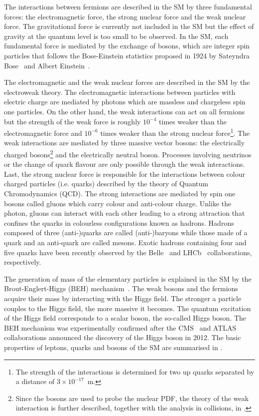 The interactions between fermions are described in the SM by three fundamental forces: the electromagnetic force, the strong nuclear force and the weak nuclear force. The gravitational force is currently not included in the SM but the effect of gravity at the quantum level is too small to be observed. In the SM, each fundamental force is mediated by the exchange of bosons, which are integer spin particles that follows the Bose-Einstein statistics proposed in 1924 by Sateyndra Bose~\cite{BoseEinsteinStatistics_1} and Albert Einstein~\cite{BoseEinsteinStatistics_2}.

The electromagnetic and the weak nuclear forces are described in the SM by the electroweak theory. The electromagnetic interactions between particles with electric charge are mediated by photons which are massless and chargeless spin one particles. On the other hand, the weak interactions can act on all fermions but the strength of the weak force is roughly $10^{-4}$ times weaker than the electromagnetic force and $10^{-6}$ times weaker than the strong nuclear force\footnote{The strength of the interactions is determined for two up quarks separated by a distance of $3\times{10^{-17}}$~m.}. The weak interactions are mediated by three massive vector bosons: the electrically charged \Wpm bosons\footnote{Since the \Wb bosons are used to probe the nuclear PDF, the theory of the weak interaction is further described, together with the analysis in \RunpPb collisions, in .} and the electrically neutral {\PZ} boson. Processes involving neutrinos or the change of quark flavour are only possible through the weak interactions. Last, the strong nuclear force is responsible for the interactions between colour charged particles (i.e. quarks) described by the theory of Quantum Chromodynamics (QCD). The strong interactions are mediated by spin one bosons called gluons which carry colour and anti-colour charge. Unlike the photon, gluons can interact with each other leading to a strong attraction that confines the quarks in colourless configurations known as hadrons. Hadrons composed of three (anti-)quarks are called (anti-)baryons while those made of a quark and an anti-quark are called mesons. Exotic hadrons containing four and five quarks have been recently observed by the Belle~\cite{Tetraquark} and LHCb~\cite{Pentaquarks} collaborations, respectively.

The generation of mass of the elementary particles is explained in the SM by the Brout-Englert-Higgs (BEH) mechanism~\cite{HiggsMechanism_1,HiggsMechanism_2}. The weak bosons and the fermions acquire their mass by interacting with the Higgs field. The stronger a particle couples to the Higgs field, the more massive it becomes. The quantum excitation of the Higgs field corresponds to a scalar boson, the so-called Higgs boson. The BEH mechanism was experimentally confirmed after the CMS~\cite{HiggsBoson_CMS} and ATLAS~\cite{HiggsBoson_ATLAS} collaborations announced the discovery of the Higgs boson in 2012. The basic properties of leptons, quarks and bosons of the SM are summarised in .


